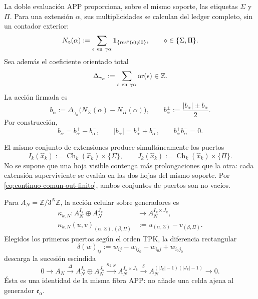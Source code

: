 La doble evaluación APP proporciona, sobre el mismo soporte, las etiquetas
\(\Sigma\) y \(\Pi\). Para una extensión \(\alpha\), sus multiplicidades
se calculan del ledger completo, sin un contador exterior:
\begin{equation}
\label{eq:pdfv2-cor-multiplicidades-hojas}
 N_\diamond(\alpha):=
 \sum_{\epsilon\ {\rm en}\ \gamma\alpha}
 \mathbf1_{\{\operatorname{res}^{\diamond}(\epsilon)\neq0\}},
 \qquad \diamond\in\{\Sigma,\Pi\}.
\end{equation}
Sea además el coeficiente orientado total
\[
 \Delta_{\gamma_\alpha}:=
 \sum_{\epsilon\ {\rm en}\ \gamma\alpha}\operatorname{or}(\epsilon)
 \in\mathbb Z.
\]
La acción firmada es
\begin{equation}
\label{eq:pdfv2-cor-b-alpha}
 b_\alpha:=\Delta_{\gamma_\alpha}
 \bigl(N_\Sigma(\alpha)-N_\Pi(\alpha)\bigr),
 \qquad
 b_\alpha^\pm:=\frac{|b_\alpha|\pm b_\alpha}{2}.
\end{equation}
Por construcción,
\begin{equation}
\label{eq:pdfv2-cor-b-identidades}
 b_\alpha=b_\alpha^+-b_\alpha^-,\qquad
 |b_\alpha|=b_\alpha^++b_\alpha^-,\qquad
 b_\alpha^+b_\alpha^-=0.
\end{equation}

El mismo conjunto de extensiones produce simultáneamente los puertos
\begin{equation}
\label{eq:pdfv2-cor-puertos-comunes}
 I_k(\widehat x_k):=
 \operatorname{Ch}_k(\widehat x_k)\times\{\Sigma\},
 \qquad
 J_k(\widehat x_k):=
 \operatorname{Ch}_k(\widehat x_k)\times\{\Pi\}.
\end{equation}
No se supone que una hoja visible contenga más prolongaciones que la otra:
cada extensión superviviente se evalúa en las dos hojas del mismo soporte.
Por \eqref{eq:continuo-comun-out-finito}, ambos conjuntos de puertos son no
vacíos.

Para \(A_N=\mathbb Z/3^N\mathbb Z\), la acción celular sobre generadores es
\begin{equation}
\label{eq:pdfv2-cor-kappa-celda}
 \begin{aligned}
 \kappa_{k,N}:A_N^{I_k}\oplus A_N^{J_k}
 &\longrightarrow A_N^{I_k\times J_k},\\
 \kappa_{k,N}(u,v)_{(\alpha,\Sigma),(\beta,\Pi)}
 &:=u_{(\alpha,\Sigma)}-v_{(\beta,\Pi)}.
 \end{aligned}
\end{equation}
Elegidos los primeros puertos según el orden TPK, la diferencia rectangular
\begin{equation}
\label{eq:pdfv2-cor-delta-celda}
 \delta(w)_{ij}:=w_{ij}-w_{ij_0}-w_{i_0j}+w_{i_0j_0}
\end{equation}
descarga la sucesión escindida
\begin{equation}
\label{eq:pdfv2-cor-sucesion-celda}
 0\longrightarrow A_N\xrightarrow{\Delta}
 A_N^{I_k}\oplus A_N^{J_k}
 \xrightarrow{\kappa_{k,N}}A_N^{I_k\times J_k}
 \xrightarrow{\delta}A_N^{(|I_k|-1)(|J_k|-1)}
 \longrightarrow0.
\end{equation}
Ésta es una identidad de la misma fibra APP: no añade una celda ajena al
generador \(\mathfrak e_\alpha\).

